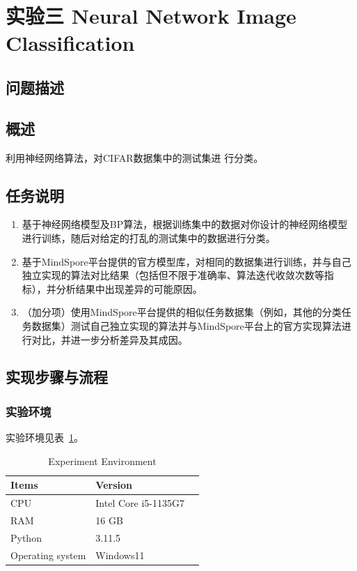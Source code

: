 \documentclass[12pt]{article}
\begin{document}
\newpage
\section{\centering 实验三 Neural Network Image Classification}

\subsection{问题描述}
\subsection{概述}
利用神经网络算法，对CIFAR数据集中的测试集进
行分类。
\subsection{任务说明}
\begin{enumerate}%
  \item 基于神经网络模型及BP算法，根据训练集中的数据对你设计的神经网络模型进行训练，随后对给定的打乱的测试集中的数据进行分类。

  \item 基于MindSpore平台提供的官方模型库，对相同的数据集进行训练，并与自己独立实现的算法对比结果（包括但不限于准确率、算法迭代收敛次数等指标），并分析结果中出现差异的可能原因。

  \item （加分项）使用MindSpore平台提供的相似任务数据集（例如，其他的分类任务数据集）测试自己独立实现的算法并与MindSpore平台上的官方实现算法进行对比，并进一步分析差异及其成因。
\end{enumerate}

\subsection{实现步骤与流程}
\subsubsection{实验环境}
实验环境见表~\ref{tab:indicators}。

\begin{table}[!t]
  \caption{Experiment Environment}
  \label{tab:indicators}
  \centering
  \begin{tabular}{m{5cm}<{\centering}m{5cm}<{\centering}m{4cm}<{\centering}}
    \toprule
    \textbf{Items}   & \textbf{Version}     \\[\medskipamount]
    \midrule
    CPU              & Intel Core i5-1135G7 \\[\medskipamount]
    RAM              & 16 GB                \\[\medskipamount]
    Python           & 3.11.5               \\[\medskipamount]
    Operating system & Windows11            \\[\medskipamount]
    \bottomrule
  \end{tabular}
\end{table}
\end{document}
